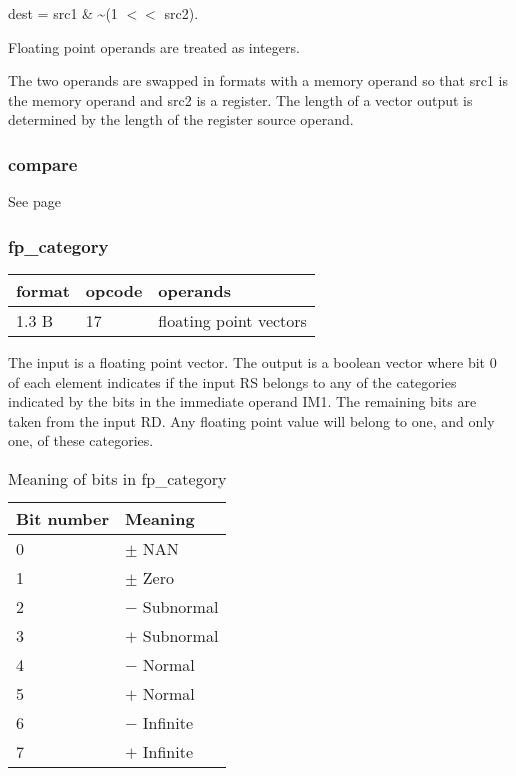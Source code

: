 \documentclass[forwardcom.tex]{subfiles}
\begin{document}
dest = src1 \& \~{}(1 $<<$ src2).

\vspace{2mm}
Floating point operands are treated as integers.

\vspace{2mm}
The two operands are swapped in formats with a memory operand so that src1 is the memory operand and src2 is a register. The length of a vector output is determined by the length of the register source operand.

\subsubsection{compare}
See page \pageref{table:compareInstruction}
\vspace{2mm}

\subsubsection{fp\_category}
\label{table:fpCategoryInstruction}
\begin{tabular}{|p{12mm}|p{12mm}|p{110mm}|}
\hline
\bfseries format & \bfseries opcode & \bfseries operands \\ \hline
1.3 B & 17 & floating point vectors \\ \hline
\end{tabular}
\vspace{2mm}

The input is a floating point vector. The output is a boolean vector where bit 0 of each element indicates if the input RS belongs to any of the categories indicated by the bits in the immediate operand IM1. The remaining bits are taken from the input RD. Any floating point value will belong to one, and only one, of these categories. 

\begin{longtable} {|p{20mm}|p{90mm}|}
\caption{Meaning of bits in fp\_category} 
\label{table:fpCategoryInstructionBits} \\
\endfirsthead
\endhead
\hline
\bfseries Bit number & \bfseries Meaning  \\
\hline
0 & $\pm$ NAN \\
1 & $\pm$ Zero \\
2 & $-$ Subnormal \\
3 & $+$ Subnormal \\
4 & $-$ Normal \\
5 & $+$ Normal \\
6 & $-$ Infinite  \\
7 & $+$ Infinite  \\
\hline
\end{longtable}
\end{document}
